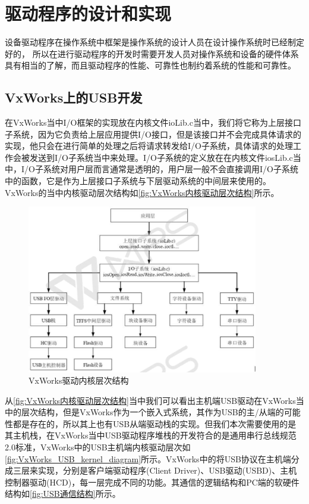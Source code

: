 \chapter{驱动程序的设计和实现}
	
	设备驱动程序在操作系统中框架是操作系统的设计人员在设计操作系统时已经制定好的，	所以在进行驱动程序的开发时需要开发人员对操作系统和设备的硬件体系具有相当的了解，而且驱动程序的性能、可靠性也制约着系统的性能和可靠性。	


\section{VxWorks上的USB开发}\label{sec:USB开发}
	在VxWorks当中I/O框架的实现放在内核文件ioLib.c当中，我们将它称为上层接口子系统，因为它负责给上层应用提供I/O接口，但是该接口并不会完成具体请求的实现，他只会在进行简单的处理之后将请求转发给I/O子系统，具体请求的处理工作会被发送到I/O子系统当中来处理。I/O子系统的定义放在在内核文件iosLib.c当中，I/O子系统对用户层而言通常是透明的，用户层一般不会直接调用I/O子系统中的函数，它是作为上层接口子系统与下层驱动系统的中间层来使用的。VxWorks的当中内核驱动层次结构如\autoref{fig:VxWorks内核驱动层次结构}所示。	

\begin{figure}[!h]
\centering
\includegraphics[width=0.9\textwidth]{./graphics/vxworks-kernel-diagram.pdf}
\caption{VxWorks驱动内核层次结构}\label{fig:VxWorks内核驱动层次结构}
\end{figure}	
			
	从\autoref{fig:VxWorks内核驱动层次结构}当中我们可以看出主机端USB驱动在VxWorks当中的层次结构，但是VxWorks作为一个嵌入式系统，其作为USB的主/从端的可能性都是存在的，所以其上也有USB从端驱动栈的实现。但我们本次需要使用的是其主机栈，在VxWorks当中USB驱动程序堆栈的开发符合的是通用串行总线规范2.0标准，VxWorks中的USB主机端内核驱动层次如\autoref{fig:VxWorks_USB_kernel_diagram}所示。VxWorks中的将USB协议在主机端分成三层来实现，分别是客户端驱动程序(Client Driver)、USB驱动(USBD)、主机控制器驱动(HCD)，每一层完成不同的功能。其通信的逻辑结构和PC端的软硬件结构如\autoref{fig:USB通信结构}所示。

